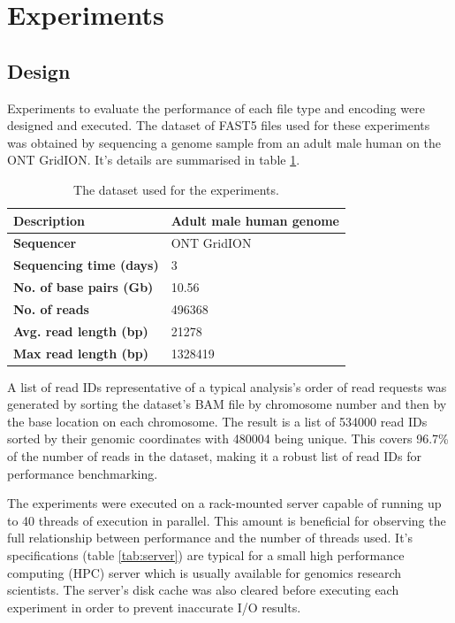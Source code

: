 \section{Experiments}
\label{sec:experi}

\subsection{Design}
\label{sec:experi:design}

Experiments to evaluate the performance of each file type and encoding were designed and executed. The dataset of FAST5 files used for these experiments was obtained by sequencing a genome sample from an adult male human on the ONT GridION. It's details are summarised in table \ref{tab:data}.

\begin{table}[h!]
    \caption{The dataset used for the experiments.\label{tab:data}}
    \begin{tabular}{|l|l|}
        \hline
        \textbf{Description} & Adult male human genome \\
        \hline
        \textbf{Sequencer} & ONT GridION \\
        \textbf{Sequencing time (days)} & 3 \\
        \hline
        \textbf{No.\nomenclature{No.}{Number} of base pairs (Gb\nomenclature{Gb}{Giga base pairs})} & 10.56 \\
        \textbf{No. of reads} & \num{496368} \\
        \textbf{Avg.\nomenclature{Avg.}{Average} read length (bp\nomenclature{bp}{Base pairs})} & \num{21278} \\
        \textbf{Max read length (bp)} & \num{1328419} \\
        \hline
    \end{tabular}
\end{table}

A list of read IDs representative of a typical analysis's order of read requests was generated by sorting the dataset's BAM file \cite{sam:file} by chromosome number and then by the base location on each chromosome. The result is a list of \num{534000} read IDs sorted by their genomic coordinates with \num{480004} being unique. This covers 96.7\% of the number of reads in the dataset, making it a robust list of read IDs for performance benchmarking.

The experiments were executed on a rack-mounted server capable of running up to 40 threads of execution in parallel. This amount is beneficial for observing the full relationship between performance and the number of threads used. It's specifications (table \ref{tab:server}) are typical for a small high performance computing (HPC) server which is usually available for genomics research scientists. The server's disk cache was also cleared before executing each experiment in order to prevent inaccurate I/O results.

